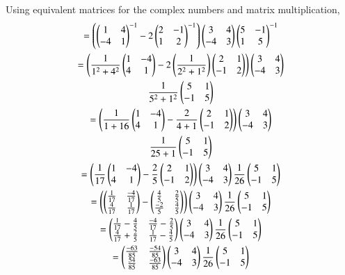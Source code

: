 Using  equivalent matrices for the complex numbers and matrix multiplication,
\begin{multline}
 =\brak{\myvec{1 & 4 \\ -4 & 1}^{-1} - 2\myvec{2 & -1 \\ 1 & 2}^{-1}}\myvec{3 & 4 \\ -4 & 3}\myvec{5 & -1 \\ 1 & 5}^{-1}\\
 =\brak{\frac{1}{1^2 + 4^2}\myvec{1 & -4 \\ 4 & 1} - 2\brak{\frac{1}{2^2 + 1^2}}\myvec{2 & 1 \\ -1 & 2}}\myvec{3 & 4\\ -4 & 3}\\
   \frac{1}{5^2 + 1^2}\myvec{5 & 1 \\ -1 & 5}\\
 =\brak{\frac{1}{1+16}\myvec{1 & -4 \\ 4 & 1} -\frac{2}{4+1}\myvec{2 & 1 \\ -1 & 2}}\myvec{3 & 4\\ -4 & 3}\\
    \frac{1}{25+1}\myvec{5 & 1 \\ -1 & 5}\\
  =\brak{\frac{1}{17}\myvec{1 & -4 \\4 & 1} -\frac{2}{5}\myvec{2 & 1 \\ -1 & 2}}\myvec{3 & 4 \\ -4 & 3}\frac{1}{26}\myvec{5 & 1 \\ -1 & 5}\\
 =\brak{\myvec{\frac{1}{17} & \frac{-4}{17} \\ \frac{4}{17} & \frac{1}{17}} - \myvec{\frac{4}{5} & \frac{2}{5} \\ \frac{-2}{5} & \frac{4}{5}}}\myvec{3 & 4 \\ -4 & 3}\frac{1}{26}\myvec{5 & 1 \\ -1 & 5}\\
 =\myvec{\frac{1}{17}-\frac{4}{5} & \frac{-4}{17}-\frac{2}{5} \\ \frac{4}{17}+\frac{2}{5} & \frac{1}{17}-\frac{4}{5}}\myvec{3 & 4 \\ -4 & 3}\frac{1}{26}\myvec{5 & 1 \\ -1 & 5}\\
 =\myvec{\frac{-63}{85} & \frac{-54}{85} \\ \frac{54}{85} & \frac{-63}{85}}\myvec{3 & 4\\ -4 & 3}\frac{1}{26}\myvec{5 & 1 \\ -1 & 5}\\

\end{multline}
